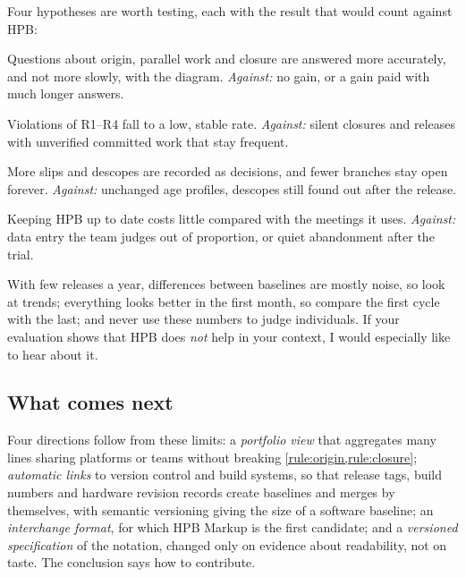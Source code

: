 \noindent Four hypotheses are worth testing, each with the result that
would count against HPB:
\begin{description}[leftmargin=0pt,itemsep=1pt,font=\normalfont\bfseries]
  \item[H1 Comprehension.] Questions about origin, parallel work and
        closure are answered more accurately, and not more slowly, with the
        diagram. \emph{Against:} no gain, or a gain paid with much longer
        answers.
  \item[H2 Discipline.] Violations of R1--R4 fall to a low, stable rate.
        \emph{Against:} silent closures and releases with unverified
        committed work that stay frequent.
  \item[H3 Decisions.] More slips and descopes are recorded as decisions,
        and fewer branches stay open forever. \emph{Against:} unchanged age
        profiles, descopes still found out after the release.
  \item[H4 Cost.] Keeping HPB up to date costs little compared with the
        meetings it uses. \emph{Against:} data entry the team judges out of
        proportion, or quiet abandonment after the trial.
\end{description}

\noindent With few releases a year, differences between baselines are
mostly noise, so look at trends; everything looks better in the first
month, so compare the first cycle with the last; and never use these
numbers to judge individuals. If your evaluation shows that HPB does
\emph{not} help in your context, I would especially like to hear about it.

\subsection{What comes next}
\label{sec:limitations-next}

Four directions follow from these limits: a \emph{portfolio view} that
aggregates many lines sharing platforms or teams without breaking
\cref{rule:origin,rule:closure}; \emph{automatic links} to version control
and build systems, so that release tags, build numbers and hardware
revision records create baselines and merges by themselves, with semantic
versioning \citep{semver} giving the size of a software baseline; an
\emph{interchange format}, for which HPB Markup is the first candidate; and
a \emph{versioned specification} of the notation, changed only on evidence
about readability, not on taste. The conclusion says how to contribute.

